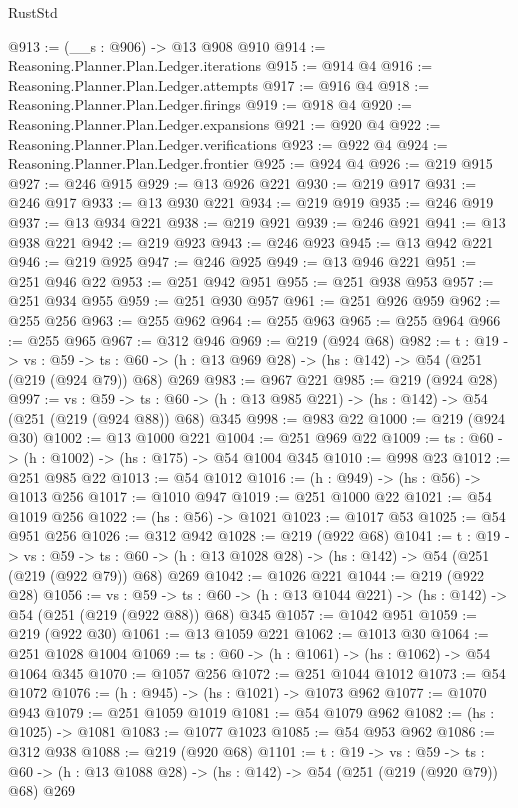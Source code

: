 \begin{lexlean}{RustStd}
\begin{coremodule}
@913 := (__s : @906) -> @13 @908 @910
@914 := Reasoning.Planner.Plan.Ledger.iterations
@915 := @914 @4
@916 := Reasoning.Planner.Plan.Ledger.attempts
@917 := @916 @4
@918 := Reasoning.Planner.Plan.Ledger.firings
@919 := @918 @4
@920 := Reasoning.Planner.Plan.Ledger.expansions
@921 := @920 @4
@922 := Reasoning.Planner.Plan.Ledger.verifications
@923 := @922 @4
@924 := Reasoning.Planner.Plan.Ledger.frontier
@925 := @924 @4
@926 := @219 @915
@927 := @246 @915
@929 := @13 @926 @221
@930 := @219 @917
@931 := @246 @917
@933 := @13 @930 @221
@934 := @219 @919
@935 := @246 @919
@937 := @13 @934 @221
@938 := @219 @921
@939 := @246 @921
@941 := @13 @938 @221
@942 := @219 @923
@943 := @246 @923
@945 := @13 @942 @221
@946 := @219 @925
@947 := @246 @925
@949 := @13 @946 @221
@951 := @251 @946 @22
@953 := @251 @942 @951
@955 := @251 @938 @953
@957 := @251 @934 @955
@959 := @251 @930 @957
@961 := @251 @926 @959
@962 := @255 @256
@963 := @255 @962
@964 := @255 @963
@965 := @255 @964
@966 := @255 @965
@967 := @312 @946
@969 := @219 (@924 @68)
@982 := {t : @19} ->
  {vs : @59} ->
  {ts : @60} -> (h : @13 @969 @28) -> (hs : @142) -> @54 (@251 (@219 (@924 @79)) @68) @269
@983 := @967 @221
@985 := @219 (@924 @28)
@997 := {vs : @59} ->
  {ts : @60} -> (h : @13 @985 @221) -> (hs : @142) -> @54 (@251 (@219 (@924 @88)) @68) @345
@998 := @983 @22
@1000 := @219 (@924 @30)
@1002 := @13 @1000 @221
@1004 := @251 @969 @22
@1009 := {ts : @60} -> (h : @1002) -> (hs : @175) -> @54 @1004 @345
@1010 := @998 @23
@1012 := @251 @985 @22
@1013 := @54 @1012
@1016 := (h : @949) -> (hs : @56) -> @1013 @256
@1017 := @1010 @947
@1019 := @251 @1000 @22
@1021 := @54 @1019 @256
@1022 := (hs : @56) -> @1021
@1023 := @1017 @53
@1025 := @54 @951 @256
@1026 := @312 @942
@1028 := @219 (@922 @68)
@1041 := {t : @19} ->
  {vs : @59} ->
  {ts : @60} -> (h : @13 @1028 @28) -> (hs : @142) -> @54 (@251 (@219 (@922 @79)) @68) @269
@1042 := @1026 @221
@1044 := @219 (@922 @28)
@1056 := {vs : @59} ->
  {ts : @60} -> (h : @13 @1044 @221) -> (hs : @142) -> @54 (@251 (@219 (@922 @88)) @68) @345
@1057 := @1042 @951
@1059 := @219 (@922 @30)
@1061 := @13 @1059 @221
@1062 := @1013 @30
@1064 := @251 @1028 @1004
@1069 := {ts : @60} -> (h : @1061) -> (hs : @1062) -> @54 @1064 @345
@1070 := @1057 @256
@1072 := @251 @1044 @1012
@1073 := @54 @1072
@1076 := (h : @945) -> (hs : @1021) -> @1073 @962
@1077 := @1070 @943
@1079 := @251 @1059 @1019
@1081 := @54 @1079 @962
@1082 := (hs : @1025) -> @1081
@1083 := @1077 @1023
@1085 := @54 @953 @962
@1086 := @312 @938
@1088 := @219 (@920 @68)
@1101 := {t : @19} ->
  {vs : @59} ->
  {ts : @60} -> (h : @13 @1088 @28) -> (hs : @142) -> @54 (@251 (@219 (@920 @79)) @68) @269

\end{coremodule}
\end{lexlean}
